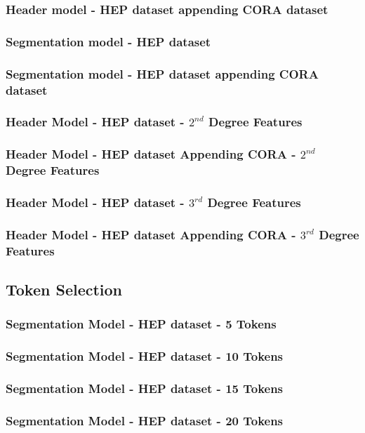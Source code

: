 \documentclass[10pt, oneside]{scrartcl}   	%
\begin{document}
\subsubsection{Header model - HEP dataset appending CORA dataset}
\subsubsection{Segmentation model - HEP dataset}
\subsubsection{Segmentation model - HEP dataset appending CORA dataset}
\subsubsection{Header Model - HEP dataset - $2^{nd}$ Degree Features}
\subsubsection{Header Model - HEP dataset Appending CORA - $2^{nd}$ Degree Features}
\subsubsection{Header Model - HEP dataset - $3^{rd}$ Degree Features}
\subsubsection{Header Model - HEP dataset Appending CORA - $3^{rd}$ Degree Features}
\subsection{Token Selection}
\subsubsection{Segmentation Model - HEP dataset - 5 Tokens}
\subsubsection{Segmentation Model - HEP dataset - 10 Tokens}
\subsubsection{Segmentation Model - HEP dataset - 15 Tokens}
\subsubsection{Segmentation Model - HEP dataset - 20 Tokens}
\end{document}
